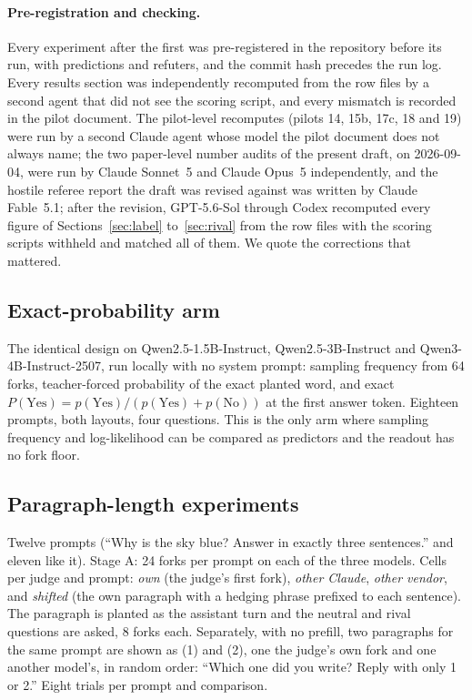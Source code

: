 \documentclass[twocolumn,10pt]{article}
\newcommand{\pyes}{P(\mathrm{Yes})}
\newcommand{\gpt}{GPT-5.6-Sol}
\begin{document}
\paragraph{Pre-registration and checking.} Every experiment after the first was pre-registered in the repository before its run, with predictions and refuters, and the commit hash precedes the run log. Every results section was independently recomputed from the row files by a second agent that did not see the scoring script, and every mismatch is recorded in the pilot document. The pilot-level recomputes (pilots 14, 15b, 17c, 18 and 19) were run by a second Claude agent whose model the pilot document does not always name; the two paper-level number audits of the present draft, on 2026-09-04, were run by Claude Sonnet~5 and Claude Opus~5 independently, and the hostile referee report the draft was revised against was written by Claude Fable~5.1; after the revision, \gpt{} through Codex recomputed every figure of Sections~\ref{sec:label} to~\ref{sec:rival} from the row files with the scoring scripts withheld and matched all of them. We quote the corrections that mattered.

\subsection{Exact-probability arm}

The identical design on Qwen2.5-1.5B-Instruct, Qwen2.5-3B-Instruct and Qwen3-4B-Instruct-2507, run locally with no system prompt: sampling frequency from 64 forks, teacher-forced probability of the exact planted word, and exact $\pyes = p(\mathrm{Yes})/(p(\mathrm{Yes})+p(\mathrm{No}))$ at the first answer token. Eighteen prompts, both layouts, four questions. This is the only arm where sampling frequency and log-likelihood can be compared as predictors and the readout has no fork floor.

\subsection{Paragraph-length experiments}

Twelve prompts (``Why is the sky blue? Answer in exactly three sentences.'' and eleven like it). Stage A: 24 forks per prompt on each of the three models. Cells per judge and prompt: \emph{own} (the judge's first fork), \emph{other Claude}, \emph{other vendor}, and \emph{shifted} (the own paragraph with a hedging phrase prefixed to each sentence). The paragraph is planted as the assistant turn and the neutral and rival questions are asked, 8 forks each. Separately, with no prefill, two paragraphs for the same prompt are shown as (1) and (2), one the judge's own fork and one another model's, in random order: ``Which one did you write? Reply with only 1 or 2.'' Eight trials per prompt and comparison.
\end{document}
